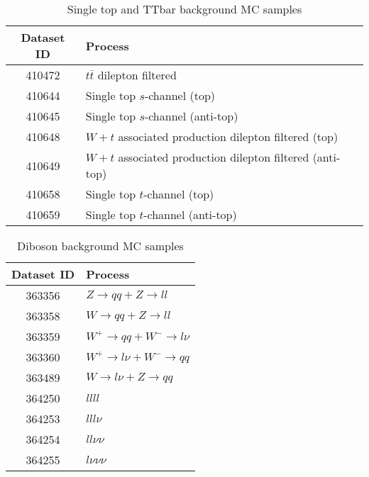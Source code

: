 \documentclass[12pt, a4paper]{book}
\begin{document}
\begin{table}[!h]
    \centering
    \caption{Single top and TTbar background MC samples}
    \begin{tabular}{c|l}\midrule\midrule
        Dataset ID              & Process\\\midrule
        410472                  & $t\bar{t}$ dilepton filtered\\
        410644                  & Single top $s$-channel (top)\\
        410645                  & Single top $s$-channel (anti-top)\\
        410648                  & $W+t$ associated production dilepton filtered (top)\\
        410649                  & $W+t$ associated production dilepton filtered (anti-top)\\
        410658                  & Single top $t$-channel (top)\\
        410659                  & Single top $t$-channel (anti-top)\\\midrule\midrule
    \end{tabular}
    \label{tab:top_DSID}
\end{table}

\begin{table}[!h]
    \centering
    \caption{Diboson background MC samples}
    \begin{tabular}{c|l}\midrule\midrule
        Dataset ID              & Process\\\midrule
        363356                  & $Z\rightarrow qq + Z\rightarrow ll$\\
        363358                  & $W\rightarrow qq + Z\rightarrow ll$\\
        363359                  & $W^+\rightarrow qq + W^-\rightarrow l\nu$\\
        363360                  & $W^+\rightarrow l\nu+W^-\rightarrow qq$\\
        363489                  & $W\rightarrow l\nu + Z\rightarrow qq$\\
        364250                  & $llll$\\
        364253                  & $lll\nu$\\
        364254                  & $ll\nu\nu$\\
        364255                  & $l\nu\nu\nu$\\\midrule\midrule
    \end{tabular}
    \label{tab:Diboson_DSID}
\end{table}
\end{document}
